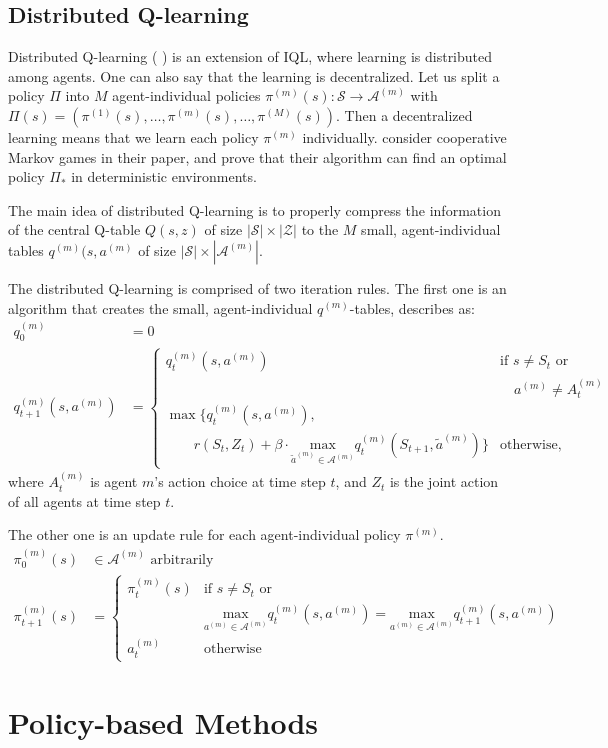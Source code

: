 \subsection{Distributed Q-learning}
Distributed Q-learning (\citeauthor{lauer2000algorithm} \cite{lauer2000algorithm}) is an extension of IQL, where learning is distributed among agents. One can also say that the learning is decentralized. Let us split a policy $\Pi$ into $M$ agent-individual policies $\pi^{(m)}(s): \mathcal{S} \rightarrow \mathcal{A}^{(m)}$ with $\Pi(s) = (\pi^{(1)}(s), \dots, \pi^{(m)}(s), \dots,  \pi^{(M)}(s))$. Then a decentralized learning means that we learn each policy $\pi^{(m)}$ individually. \citeauthor{lauer2000algorithm} \cite{lauer2000algorithm} consider cooperative Markov games in their paper, and prove that their algorithm can find an optimal policy $\Pi_\ast$ in deterministic environments.

The main idea of distributed Q-learning is to properly compress the information of the central Q-table $Q(s,z)$ of size $|\mathcal{S}| \times |\mathcal{Z}|$ to the $M$ small, agent-individual tables $q^{(m)}(s,a^{(m)}$ of size $|\mathcal{S}| \times |\mathcal{A}^{(m)}|$.



The distributed Q-learning is comprised of two iteration rules. The first one is an algorithm that creates the small, agent-individual $q^{(m)}$-tables, describes as:
\begin{align}
    q_0^{(m)} &= 0\nonumber\\
    q_{t+1}^{(m)}(s,a^{(m)}) &=
    \begin{cases}
        q_t^{(m)}(s,a^{(m)}) &\mbox{if } s\neq S_t \text{ or }\\ & \quad a^{(m)}\neq A_t^{(m)}\\
    \max\{q_t^{(m)}(s,a^{(m)}), \\ \qquad r(S_t,Z_t) + \beta \cdot \underset{\tilde{a}^{(m)}\in\mathcal{A}^{(m)}}{\text{max}}q_t^{(m)}(S_{t+1}, \tilde{a}^{(m)})\} & \mbox{otherwise,}
    \end{cases}
\end{align}
where $A_t^{(m)}$ is agent $m$'s action choice at time step $t$, and $Z_t$ is the joint action of all agents at time step $t$.


The other one is an update rule for each agent-individual policy $\pi^{(m)}$.
\begin{align}
\pi_0^{(m)}(s) &\in \mathcal{A}^{(m)} \text{ arbitrarily }\nonumber\\
\pi_{t+1}^{(m)}(s) &= \begin{cases}
\pi_t^{(m)}(s) &\mbox{if }s\neq S_t \text{ or }\\
& \underset{a^{(m)}\in\mathcal{A}^{(m)}}{\text{max}}q_t^{(m)}(s,a^{(m)}) = \underset{a^{(m)}\in\mathcal{A}^{(m)}}{\text{max}}q_{t+1}^{(m)}(s,a^{(m)})\\
a_t^{(m)} &\mbox{otherwise}
\end{cases}
\end{align}




\section{Policy-based Methods}









